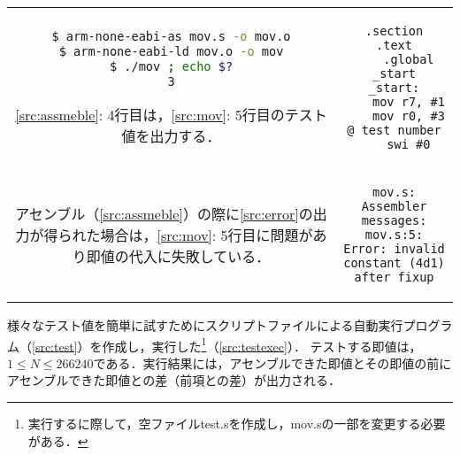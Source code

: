 \begin{tabular}[c]{cc}
    \begin{minipage}[t]{0.45\textwidth}
        \centering
        \begin{lstlisting}[caption={アセンブル},label={src:assmeble},language={Bash},frame={left}]
$ arm-none-eabi-as mov.s -o mov.o
$ arm-none-eabi-ld mov.o -o mov
$ ./mov ; echo $?
3
    \end{lstlisting}
        \begin{flushleft}
            \ref{src:assmeble}: 4行目は，\ref{src:mov}: 5行目のテスト値を出力する．
        \end{flushleft}
    \end{minipage} &
    \begin{minipage}[t]{0.45\textwidth}
        \centering
        \begin{lstlisting}[caption={{\ttfamily mov.s}},label={src:mov},frame={left}]
    .section    .text
    .global     _start
_start:
    mov r7, #1
    mov r0, #3 @ test number
    swi #0
\end{lstlisting}
    \end{minipage}
    \vspace{0.5em}                                                                          \\
    \begin{minipage}[c]{0.45\textwidth}
        アセンブル（\ref{src:assmeble}）の際に\ref{src:error}の出力が得られた場合は，\ref{src:mov}: 5行目に問題があり即値の代入に失敗している．
    \end{minipage}
    \hspace{1em}                                                                          &
    \begin{minipage}[c]{0.45\textwidth}
        \begin{lstlisting}[numbers={none},caption={Error出力},label={src:error},frame={single}]
mov.s: Assembler messages:
mov.s:5: Error: invalid constant (4d1) after fixup
    \end{lstlisting}
    \end{minipage}
\end{tabular}
様々なテスト値を簡単に試すためにスクリプトファイルによる自動実行プログラム（\ref{src:test}）を作成し，実行した\footnote{実行するに際して，空ファイル{\ttfamily test.s}を作成し，{\ttfamily mov.s}の一部を変更する必要がある．}（\ref{src:testexec}）．
テストする即値は，\(1\leq N\leq 266240\)である．実行結果には，アセンブルできた即値とその即値の前にアセンブルできた即値との差（前項との差）が出力される．\par
